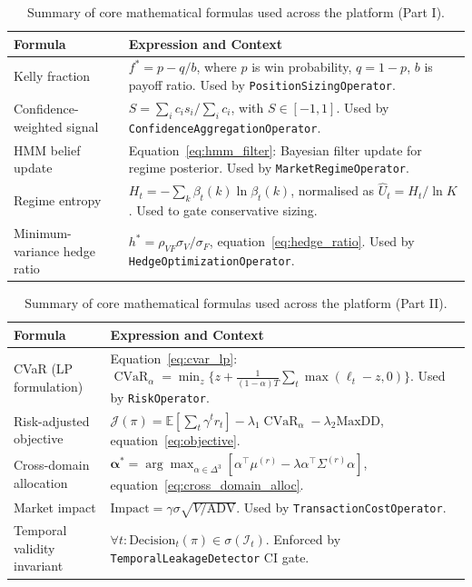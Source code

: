 \documentclass[12pt,openany]{book}
\numberwithin{equation}{chapter}
\theoremstyle{plain}
\theoremstyle{definition}
\theoremstyle{remark}
\DeclareMathOperator{\CVaR}{CVaR}
\begin{document}
\begin{table}[H]
\centering
\caption{Summary of core mathematical formulas used across the platform (Part I).}
\label{tab:formulas_1}
\small
\begin{tabularx}{\textwidth}{p{3.8cm} p{11.0cm}}
\toprule
\textbf{Formula} & \textbf{Expression and Context} \\
\midrule
Kelly fraction &
    $f^* = p - q/b$, where $p$ is win probability, $q=1-p$, $b$ is payoff ratio.
    Used by \texttt{PositionSizingOperator}. \\
\midrule
Confidence-weighted signal &
    $S = \sum_i c_i s_i / \sum_i c_i$, with $S \in [-1,1]$.
    Used by \texttt{ConfidenceAggregationOperator}. \\
\midrule
HMM belief update &
    Equation~\eqref{eq:hmm_filter}: Bayesian filter update for regime posterior.
    Used by \texttt{MarketRegimeOperator}. \\
\midrule
Regime entropy &
    $H_t = -\sum_k \beta_t(k) \ln \beta_t(k)$, normalised as $\hat{U}_t = H_t/\ln K$.
    Used to gate conservative sizing. \\
\midrule
Minimum-variance hedge ratio &
    $h^* = \rho_{VF} \sigma_V / \sigma_F$, equation~\eqref{eq:hedge_ratio}.
    Used by \texttt{HedgeOptimizationOperator}. \\
\bottomrule
\end{tabularx}
\end{table}

\begin{table}[H]
\centering
\caption{Summary of core mathematical formulas used across the platform (Part II).}
\label{tab:formulas_2}
\small
\begin{tabularx}{\textwidth}{p{3.8cm} p{11.0cm}}
\toprule
\textbf{Formula} & \textbf{Expression and Context} \\
\midrule
CVaR (LP formulation) &
    Equation~\eqref{eq:cvar_lp}: $\CVaR_\alpha = \min_z \{z + \frac{1}{(1-\alpha)T}\sum_t \max(\ell_t - z, 0)\}$.
    Used by \texttt{RiskOperator}. \\
\midrule
Risk-adjusted objective &
    $\mathcal{J}(\pi) = \mathbb{E}[\sum_t \gamma^t r_t] - \lambda_1 \CVaR_\alpha - \lambda_2 \text{MaxDD}$,
    equation~\eqref{eq:objective}. \\
\midrule
Cross-domain allocation &
    $\boldsymbol{\alpha}^* = \arg\max_{\alpha \in \Delta^3}[\alpha^\top \mu^{(r)} - \lambda \alpha^\top \Sigma^{(r)} \alpha]$,
    equation~\eqref{eq:cross_domain_alloc}. \\
\midrule
Market impact &
    $\text{Impact} = \gamma \sigma \sqrt{V/\text{ADV}}$.
    Used by \texttt{TransactionCostOperator}. \\
\midrule
Temporal validity invariant &
    $\forall t: \text{Decision}_t(\pi) \in \sigma(\mathcal{I}_t)$.
    Enforced by \texttt{TemporalLeakageDetector} CI gate. \\
\bottomrule
\end{tabularx}
\end{table}
\end{document}
